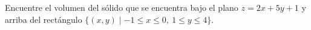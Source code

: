 \item Encuentre el volumen del sólido que se encuentra bajo el plano $z = 2x + 5y + 1$ y arriba del rectángulo $\{(x, y) \mid -1 \le x \le 0, \ 1 \le y \le 4\}$.
